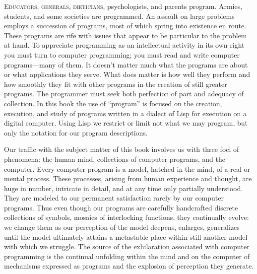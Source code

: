 \label{Foreword}

\lettrine{E}{ducators, generals, dieticians}, psychologists, and parents program.
Armies, students, and some societies are programmed.
An assault on large problems employs a succession of programs, most of which spring into existence en route.
These programs are rife with issues that appear to be particular to the problem at hand.
To appreciate programming as an intellectual activity in its own right you must turn to computer programming; you must read and write computer programs---many of them.
It doesn’t matter much what the programs are about or what applications they serve.
What does matter is how well they perform and how smoothly they fit with other programs in the creation of still greater programs.
The programmer must seek both perfection of part and adequacy of collection.
In this book the use of “program” is focused on the creation, execution, and study of programs written in a dialect of Lisp for execution on a digital computer.
Using Lisp we restrict or limit not what we may program, but only the notation for our program descriptions.

Our traffic with the subject matter of this book involves us with three foci of phenomena: the human mind, collections of computer programs, and the computer.
Every computer program is a model, hatched in the mind, of a real or mental process.
These processes, arising from human experience and thought, are huge in number, intricate in detail, and at any time only partially understood.
They are modeled to our permanent satisfaction rarely by our computer programs.
Thus even though our programs are carefully handcrafted discrete collections of symbols, mosaics of interlocking functions, they continually evolve:
we change them as our perception of the model deepens, enlarges, generalizes until the model ultimately attains a metastable place within still another model with which we struggle.
The source of the exhilaration associated with computer programming is the continual unfolding within the mind and on the computer of mechanisms expressed as programs and the explosion of perception they generate.

